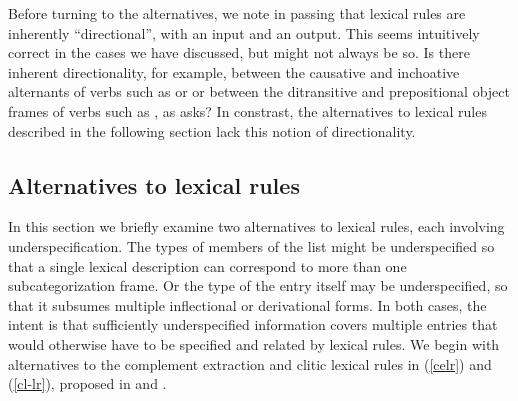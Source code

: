 \documentclass[output=paper]{langsci/langscibook}
\begin{document}
Before turning to the alternatives, we note in passing that lexical rules are inherently ``directional'', with an input and an output.
This seems intuitively correct in the cases we have discussed, but might not always be so.
Is there inherent directionality, for example, between the causative and inchoative alternants of verbs such as  or  or between the ditransitive and prepositional object frames of verbs such as , as \citet{Goldberg95a} asks?
In constrast, the alternatives to lexical rules described in the following section lack this notion of directionality.

\subsection{Alternatives to lexical rules}
\label{sec:alt}

In this section we briefly examine two alternatives to lexical rules, each involving underspecification. The types of members of the  list might be underspecified so that a single lexical description can correspond to more than one subcategorization frame. Or the type of the entry itself may be underspecified, so that it subsumes multiple inflectional or derivational forms. In both cases, the intent is that sufficiently underspecified information covers multiple entries that would otherwise have to be specified and related by lexical rules. We begin with alternatives to the complement extraction and clitic lexical rules in (\ref{celr}) and (\ref{cl-lr}), proposed in  and . 
 
\end{document}
